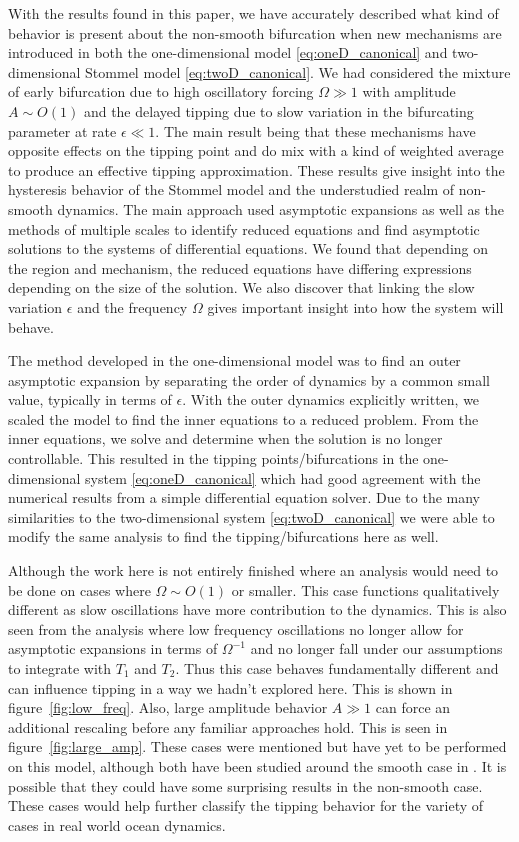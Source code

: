With the results found in this paper, we have accurately described what kind of behavior is present about the non-smooth bifurcation when new mechanisms are introduced in both the one-dimensional model \eqref{eq:oneD_canonical} and two-dimensional Stommel model \eqref{eq:twoD_canonical}. We had considered the mixture of early bifurcation due to high oscillatory forcing $\Omega\gg 1$ with amplitude $A\sim O(1)$ and the delayed tipping due to slow variation in the bifurcating parameter at rate $\epsilon\ll 1$. The main result being that these mechanisms have opposite effects on the tipping point and do mix with a kind of weighted average to produce an effective tipping approximation. These results give insight into the hysteresis behavior of the Stommel model and the understudied realm of non-smooth dynamics. The main approach used asymptotic expansions as well as the methods of multiple scales to identify reduced equations and find asymptotic solutions to the systems of differential equations. We found that depending on the region and mechanism, the reduced equations have differing expressions depending on the size of the solution. We also discover that linking the slow variation $\epsilon$ and the frequency $\Omega$ gives important insight into how the system will behave. 

The method developed in the one-dimensional model was to find an outer asymptotic expansion by separating the order of dynamics by a common small value, typically in terms of $\epsilon$. With the outer dynamics explicitly written, we scaled the model to find the inner equations to a reduced problem. From the inner equations, we solve and determine when the solution is no longer controllable. This resulted in the tipping points/bifurcations in the one-dimensional system \eqref{eq:oneD_canonical} which had good agreement with the numerical results from a simple differential equation solver. Due to the many similarities to the two-dimensional system \eqref{eq:twoD_canonical} we were able to modify the same analysis to find the tipping/bifurcations here as well.

Although the work here is not entirely finished where an analysis would need to be done on cases where $\Omega\sim O(1)$ or smaller. This case functions qualitatively different as slow oscillations have more contribution to the dynamics. This is also seen from the analysis where low frequency oscillations no longer allow for asymptotic expansions in terms of $\Omega^{-1}$ and no longer fall under our assumptions to integrate with $T_1$ and $T_2$. Thus this case behaves fundamentally different and can influence tipping in a way we hadn't explored here. This is shown in figure~\ref{fig:low_freq}. Also, large amplitude behavior $A\gg 1$ can force an additional rescaling before any familiar approaches hold. This is seen in figure~\ref{fig:large_amp}. These cases were mentioned but have yet to be performed on this model, although both have been studied around the smooth case in \cite{zhu2015tipping}. It is possible that they could have some surprising results in the non-smooth case. These cases would help further classify the tipping behavior for the variety of cases in real world ocean dynamics.

